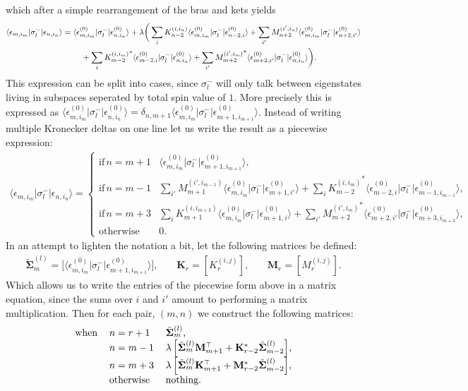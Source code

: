 \documentclass[a4paper]{memoir}
\newcommand{\bra}[1]{\langle#1|}
\newcommand{\ket}[1]{|#1\rangle}
\newcommand{\gap}{\,\,\,\,\,\,\,\,\,\,\,}
\newcommand{\enn}{\epsilon_{n,i_n}}
\newcommand{\enm}{\epsilon_{m,i_m}}
\newcommand{\ennnought}{\epsilon_{n,i_n}^{(0)}}
\newcommand{\enmnought}{\epsilon_{m,i_m}^{(0)}}
\newcommand{\enmpnought}{\epsilon_{m+1,i_{m+1}}^{(0)}}
\newcommand{\enmpppnought}{\epsilon_{m+3,i_{m+3}}^{(0)}}
\newcommand{\enmmnought}{\epsilon_{m-1,i_{m-1}}^{(0)}}
\newcommand{\bigSig}{\tilde{\mathbf{\Sigma}}^{(l)}_m}
\newcommand{\bigSigmm}{\tilde{\mathbf{\Sigma}}^{(l)}_{m-2}}
\begin{document}
which after a simple rearrangement of the bras and kets yields
\begin{align}
\bra{\enm}\sigma_l^-\ket{\enn}&=\bra{\enmnought}\sigma_l^-\ket{\ennnought}+\lambda\bigg(\sum_{i}K_{n-2}^{(i,i_n)}
  \bra{\enmnought}\sigma_l^-\ket{\epsilon_{n-2,i}^{(0)}}
  +\sum_{i'}M_{n+2}^{(i',i_n)}
  \bra{\enmnought}\sigma_l^-\ket{\epsilon_{n+2,i'}^{(0)}}\notag\\ &\gap\,\,\,
  + \sum_{i}{K_{m-2}^{(i,i_m)}}^*
  \bra{\epsilon_{m-2,i}^{(0)}}\sigma_l^-\ket{\ennnought}
  +\sum_{i'}{M_{m+2}^{(i',i_m)}}^*
  \bra{\epsilon_{m+2,i'}^{(0)}}\sigma_l^-\ket{\ennnought}\bigg). \notag \\
\end{align}
This expression can be split into cases, since $\sigma_l^-$ will only
talk between eigenstates living in subspaces seperated by total spin
value of $1$. More precisely this is expressed as
$\bra{\enmnought}\sigma_l^-\ket{\ennnought}=\delta_{n,m+1}\bra{\enmnought}\sigma_l^-\ket{\enmpnought}$. Instead
of writing multiple Kronecker deltas on one line let us write the
result as a piecewise expression:
\begin{align}
  \bra{\enm}\sigma_l^-\ket{\enn}=
  \begin{cases}
    \text{if} \,n=m+1 & \bra{\enmnought}\sigma_l^-\ket{\enmpnought}, \\
    \text{if} \,n=m-1 & \sum_{i'}M_{m+1}^{(i',i_{m-1})}
              \bra{\enmnought}\sigma_l^-\ket{\epsilon_{m+1,i'}^{(0)}}
                      + \sum_{i}{K_{m-2}^{(i,i_m)}}^*
              \bra{\epsilon_{m-2,i}^{(0)}}\sigma_l^-\ket{\enmmnought}, \\
    \text{if} \,n=m+3 & \sum_{i}K_{m+1}^{(i,i_{m+3})}
              \bra{\enmnought}\sigma_l^-\ket{\epsilon_{m+1,i}^{(0)}}
                      + \sum_{i'}{M_{m+2}^{(i',i_m)}}^*
              \bra{\epsilon_{m+2,i'}^{(0)}}\sigma_l^-\ket{\enmpppnought}, \\
    \text{otherwise} & 0.
  \end{cases}
\end{align}
In an attempt to lighten the notation a bit, let the following
matrices be defined:
\begin{align}
  \bigSig=\big[\bra{\enmnought}\sigma_l^-\ket{\enmpnought}\big],\gap
  \mathbf{K}_r=[K_r^{(i,j)}],\gap\mathbf{M}_r=[M_r^{(i,j)}].
\end{align}
Which allows us to write the entries of the piecewise form above in a
matrix equation, since the sums over $i$ and $i'$ amount to performing
a matrix multiplication. Then for each pair, $(m,n)$ we construct the
following matrices:
\begin{align}
  \begin{tabular}{lll}
    \text{when} & $n=r+1$ & $\bigSig$, \\
    & $n=m-1$ & $\lambda\left[\bigSig\mathbf{M}_{m+1}^\top+\mathbf{K}_{r-2}^*\bigSigmm\right]$, \\
    & $n=m+3$ & $\lambda\left[\bigSig\mathbf{K}_{m+1}^\top+\mathbf{M}_{r-2}^*\bigSigmm\right]$, \\
    & otherwise & nothing.
  \end{tabular}
\end{align}
\end{document}
